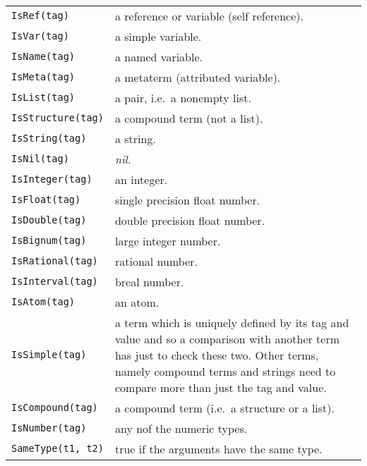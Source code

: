 \noindent
 \\
\begin{tabular}{|p{5cm}p{10cm}|} 
\hline
{\tt IsRef(tag)} &	a reference or variable (self reference). \\
{\tt IsVar(tag)} &	a simple variable. \\
{\tt IsName(tag)} &	a named variable. \\
{\tt IsMeta(tag)} &	a metaterm (attributed variable). \\

{\tt IsList(tag)} & 	a pair, i.e.\ a nonempty list. \\

{\tt IsStructure(tag)} & a compound term (not a list). \\ 

{\tt IsString(tag)} & a string. \\

{\tt IsNil(tag)} &	{\it nil}. \\

{\tt IsInteger(tag)} & an integer. \\

{\tt IsFloat(tag)} &	single precision float number. \\

{\tt IsDouble(tag)} &	double precision float number. \\
{\tt IsBignum(tag)} &	large integer number. \\
{\tt IsRational(tag)} &	rational number. \\
{\tt IsInterval(tag)} &	 breal number. \\

{\tt IsAtom(tag)} & an atom. \\

{\tt IsSimple(tag)} &	
a term which is uniquely defined by its tag and value and so a comparison with
another term has just to check these two. Other terms, namely compound
terms and strings need to compare more than just the tag and value.\\

{\tt IsCompound(tag)} & a compound term (i.e.\ a structure or a list). \\

{\tt IsNumber(tag)} &	any nof the numeric types. \\

{\tt SameType(t1, t2)} & true if the arguments have the same type. \\
\hline
\end{tabular}

